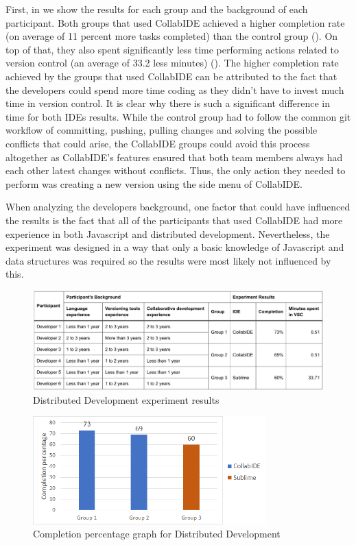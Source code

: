 First, in  we show the results for each group and the background of each participant. Both groups that used CollabIDE achieved a higher completion rate (on average of 11 percent more tasks completed) than the control group (). On top of that, they also spent significantly less time performing actions related to version control (an average of 33.2 less minutes) (). The higher completion rate achieved by the groups that used CollabIDE can be attributed to the fact that the developers could spend more time coding as they didn’t have to invest much time in version control. It is clear why there is such a significant difference in time for both IDEs results. While the control group had to follow the common git workflow of committing, pushing, pulling changes and solving the possible conflicts that could arise, the CollabIDE groups could avoid this process altogether as CollabIDE’s features ensured that both team members always had each other latest changes without conflicts. Thus, the only action they needed to perform was creating a new version using the side menu of CollabIDE.


When analyzing the developers background, one factor that could have influenced the results is the fact that all of the participants that used CollabIDE had more experience in both Javascript and distributed development. Nevertheless, the experiment was designed in a way that only a basic knowledge of Javascript and data structures was required so the results were most likely not influenced by this.

\begin{figure}[htbp]
  \centering
  \includegraphics[width=1\textwidth]{img/resultsTableCollaborative}
  \caption{Distributed Development experiment results}
  \label{fig:resultsTableCollaborative}
\end{figure}

\begin{figure}[htbp]
  \centering
  \includegraphics[width=0.8\textwidth]{img/completionCollaborative}
  \caption{Completion percentage graph for Distributed Development}
  \label{fig:completionCollaborative}
\end{figure}

